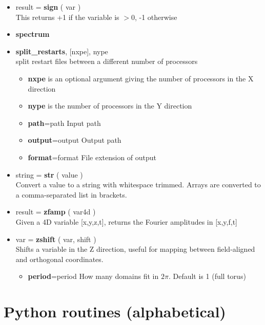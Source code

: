 \documentclass[12pt]{article}
\begin{document}
\begin{itemize}
\begin{itemize}
  \end{itemize}
%
\item result = {\bf sign} ( var ) \\
  This returns +1 if the variable is $> 0$, -1 otherwise
\item {\bf spectrum}
\item {\bf split\_restarts}, [nxpe], nype \\
  split restart files between a different number of processors
  \begin{itemize}
  \item {\bf nxpe} is an optional argument giving the number of
    processors in the X direction
  \item {\bf nype} is the number of processors in the Y direction
  \item {\bf path}=path      Input path
  \item {\bf output}=output  Output path
  \item {\bf format}=format  File extension of output
  \end{itemize}
%
\item string = {\bf str} ( value ) \\
  Convert a value to a string with whitespace trimmed. Arrays are
  converted to a comma-separated list in brackets.
\item result = {\bf zfamp} ( var4d )\\
  Given a 4D variable [x,y,z,t], returns the Fourier amplitudes in [x,y,f,t]
\item var = {\bf zshift} ( var, shift ) \\
  Shifts a variable in the Z direction, useful for mapping between field-aligned and orthogonal
  coordinates.
  \begin{itemize}
  \item {\bf period}=period  How many domains fit in $2\pi$. Default is 1 (full torus)
  \end{itemize}
%
\end{itemize}
%





\section{Python routines (alphabetical)}
%
\label{apx:py_routines}
%
\end{document}
